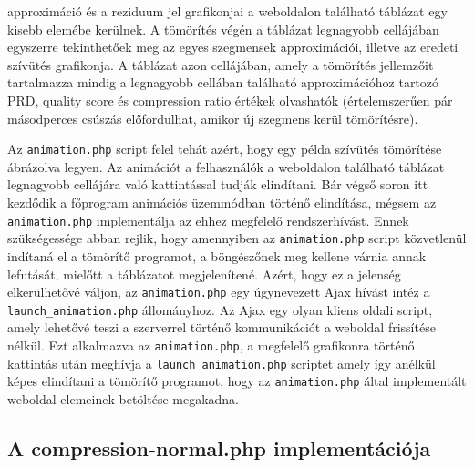 \documentclass[oneside,titlepage,12pt,a4paper]{report}
\begin{document}
approximáció és a reziduum jel grafikonjai a weboldalon található táblázat egy kisebb elemébe kerülnek. A tömörítés végén a táblázat legnagyobb cellájában egyszerre tekinthetőek meg az egyes szegmensek approximációi, illetve az eredeti szívütés grafikonja. A táblázat azon cellájában, amely a tömörítés jellemzőit tartalmazza mindig a legnagyobb cellában található approximációhoz tartozó PRD, quality score és compression ratio értékek olvashatók (értelemszerűen pár másodperces csúszás előfordulhat, amikor új szegmens kerül tömörítésre). 
\par Az \texttt{animation.php} script felel tehát azért, hogy egy példa szívütés tömörítése ábrázolva legyen. Az animációt a felhasználók a weboldalon található táblázat legnagyobb cellájára való kattintással tudják elindítani. Bár végső soron itt kezdődik a főprogram animációs üzemmódban történő elindítása, mégsem az \texttt{animation.php} implementálja az ehhez megfelelő rendszerhívást. Ennek szükségessége abban rejlik, hogy amennyiben az \texttt{animation.php} script közvetlenül indítaná el a tömörítő programot, a böngészőnek meg kellene várnia annak lefutását, mielőtt a táblázatot megjelenítené. Azért, hogy ez a jelenség elkerülhetővé váljon, az \texttt{animation.php} egy úgynevezett Ajax hívást intéz a \texttt{launch\_animation.php} állományhoz. Az Ajax egy olyan kliens oldali script, amely lehetővé teszi a szerverrel történő kommunikációt a weboldal frissítése nélkül. Ezt alkalmazva az \texttt{animation.php}, a megfelelő grafikonra történő kattintás után meghívja a \texttt{launch\_animation.php} scriptet amely így anélkül képes elindítani a tömörítő programot, hogy az \texttt{animation.php} által implementált weboldal elemeinek betöltése megakadna.  

\subsection{A compression-normal.php implementációja }
\end{document}
